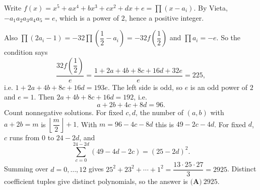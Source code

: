 Write $f(x)=x^5+ax^4+bx^3+cx^2+dx+e=\prod(x-a_i)$. By Vieta, $-a_1a_2a_3a_4a_5=e$, which is a power of $2$, hence a positive integer.

Also $\prod(2a_i-1)=-32\prod\left(\dfrac12-a_i\right)=-32f\left(\dfrac12\right)$ and $\prod a_i=-e$. So the condition says
\[\dfrac{32f\left(\dfrac12\right)}{e}=\dfrac{1+2a+4b+8c+16d+32e}{e}=225,\]
i.e. $1+2a+4b+8c+16d=193e$. The left side is odd, so $e$ is an odd power of $2$ and $e=1$. Then $2a+4b+8c+16d=192$, i.e.
\[a+2b+4c+8d=96.\]
Count nonnegative solutions. For fixed $c,d$, the number of $(a,b)$ with $a+2b=m$ is $\left\lfloor\dfrac m2\right\rfloor+1$. With $m=96-4c-8d$ this is $49-2c-4d$. For fixed $d$, $c$ runs from $0$ to $24-2d$, and
\[\sum_{c=0}^{24-2d}(49-4d-2c)=(25-2d)^2.\]
Summing over $d=0,\dots,12$ gives $25^2+23^2+\cdots+1^2=\dfrac{13\cdot25\cdot27}{3}=2925$. Distinct coefficient tuples give distinct polynomials, so the answer is $\boxed{\textbf{(A)}\ 2925}$.
